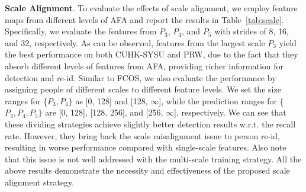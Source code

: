 \documentclass[journal]{IEEEtran}
\begin{document}
\textbf{Scale Alignment}. 
To evaluate the effects of scale alignment, we employ feature maps from different levels of AFA and report the results in Table~\ref{tab:scale}. Specifically, we evaluate the features from $P_3$, $P_4$, and $P_5$ with strides of 8, 16, and 32, respectively. As can be observed, features from the largest scale $P_3$ yield the best performance on both CUHK-SYSU and PRW, due to the fact that they absorb different levels of features from AFA, providing richer information for detection and re-id. Similar to FCOS, we also evaluate the performance by assigning people of different scales to different feature levels. We set the size ranges for \{$P_3, P_4\}$ as [0, 128] and [128, $\infty$], while the prediction ranges for \{$P_3, P_4, P_5\}$ are [0, 128], [128, 256], and [256, $\infty$], respectively. We can see that these dividing strategies achieve slightly better detection results w.r.t. the recall rate. However, they bring back the scale misalignment issue to person re-id, resulting in worse performance compared with single-scale features. Also note that this issue is not well addressed with the multi-scale training strategy. All the above results demonstrate the necessity and effectiveness of the proposed scale alignment strategy.
\end{document}
